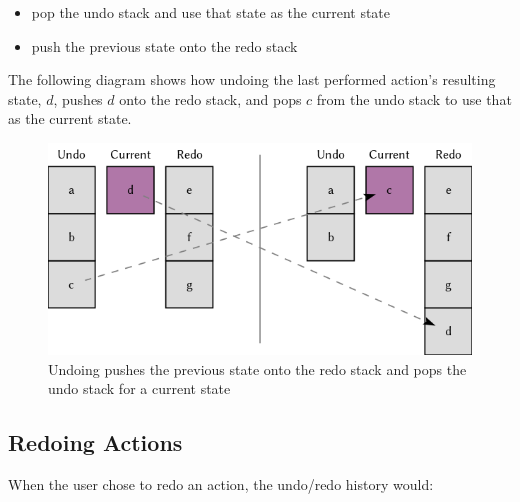 \begin{itemize}
\item pop the undo stack and use that state as the current state
\item push the previous state onto the redo stack
\end{itemize}
The following diagram shows how undoing the last performed action's resulting state, $d$, pushes $d$ onto the redo stack, and pops $c$ from the undo stack to use that as the current state.
\begin{figure}[htbp]
 \centering
 \includegraphics[width=.95\linewidth]{./pics/case3_2.png}
 \caption{Undoing pushes the previous state onto the redo stack and pops the undo stack for a current state}
 \label{fig:case3_2}
\end{figure}

\subsection{Redoing Actions}


When the user chose to redo an action, the undo/redo history would:

